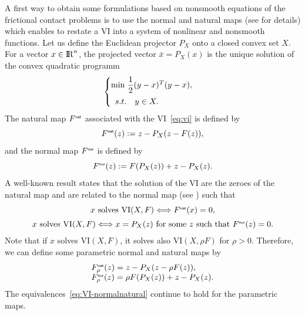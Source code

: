 A first way to obtain some formulations based on nonsmooth equations of the frictional contact problems is to use the normal and natural maps (see \cite{Facchinei.Pang2003} for details) which enables to restate a VI into a system of nonlinear and  nonsmooth functions.  Let us define the Euclidean projector $P_X$ onto a closed convex set  $X$. For a vector $x\in \mathrm{I\!R}^n$, the projected vector $\bar x  = P_X(x)$ is the unique solution of the convex quadratic programm
\begin{equation}
  \label{eq:opt-proj}
  \begin{cases}
    \min\, \Frac 1 2 (y-x)^T(y-x), \\[2mm]
    \begin{array}{ll}
    s.t. & y \in X .
  \end{array}
  \end{cases}
\end{equation}
 The natural map $F^{\hbox{\sf \tiny{nat}}}$ associated with the VI~\eqref{eq:vi} is defined by
\begin{equation}
  \label{eq:naturalmap}
  F^\nat(z) := z - P_{X}(z-F(z)),
\end{equation}
and  the normal map $F^{\hbox{\sf \tiny{nor}}}$ is defined by
\begin{equation}
  \label{eq:normalmap}
  F^\nor(z) := F(P_X(z)) + z - P_{X}(z).
\end{equation}
A well-known result states that the solution of the VI are  the zeroes of the natural map and are related to the normal map (see \cite{Facchinei.Pang2003}) such that
\begin{equation}
  \label{eq:VI-normalnatural}
  \begin{array}{c}
  x \text{ solves } \mathrm{VI}(X,F) \Longleftrightarrow  F^\nat(x)=0, \\[2mm]
  x \text{ solves } \mathrm{VI}(X,F) \Longleftrightarrow x= P_X(z) \text{ for some } z \text{ such that } F^\nor(z)=0.
\end{array}
\end{equation}
Note that if $x$ solves  $\mathrm{VI}(X,F)$, it solves also  $\mathrm{VI}(X,\rho F)$ for $\rho > 0$. Therefore, we can define some parametric normal and natural maps by
\begin{equation}
  \label{eq:parametrized-naturalnormalmap}
  \begin{array}{l}
    F_\rho^\nat(z) = z - P_{X}(z-\rho F(z)), \\
    F_\rho^\nor(z) = \rho F(P_X(z)) + z - P_{X}(z).
  \end{array}
\end{equation}
The equivalences~\eqref{eq:VI-normalnatural} continue to hold for the parametric maps. 
 

